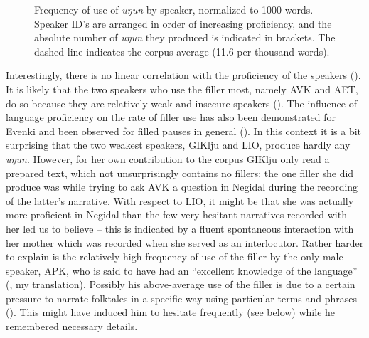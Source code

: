 \documentclass[output=paper]{langscibook}
\begin{document}
\begin{figure}
\caption{Frequency of use of \textit{uŋun} by speaker, normalized to 1000 words. Speaker ID’s are arranged in order of increasing proficiency, and the absolute number of \textit{uŋun} they produced is indicated in brackets. The dashed line indicates the corpus average (11.6 per thousand words).}
\label{fig:pakendorf:16}
\end{figure}

Interestingly, there is no linear correlation with the proficiency of the speakers (). It is likely that the two speakers who use the filler most, namely AVK and AET, do so because they are relatively weak and insecure speakers (\citealt{PakendorfAralova2018}). The influence of language proficiency on the rate of filler use has also been demonstrated for Evenki \citep[213--214]{Klyachko2022} and been observed for filled pauses in general (\citealt[220]{KosmalaCrible2022}). In this context it is a bit surprising that the two weakest speakers, GIKlju and LIO, produce hardly any \textit{uŋun}. However, for her own contribution to the corpus GIKlju only read a prepared text, which not unsurprisingly contains no fillers; the one filler she did produce was while trying to ask AVK a question in Negidal during the recording of the latter’s narrative. With respect to LIO, it might be that she was actually more proficient in Negidal than the few very hesitant narratives recorded with her led us to believe – this is indicated by a fluent spontaneous interaction with her mother which was recorded when she served as an interlocutor. Rather harder to explain is the relatively high frequency of use of the filler by the only male speaker, APK, who is said to have had an “excellent knowledge of the language” (\citealt[227]{KhasanovaKhasanova2003}, my translation). Possibly his above-average use of the filler is due to a certain pressure to narrate folktales in a specific way using particular terms and phrases (\citealt[233--234]{KhasanovaKhasanova2003}). This might have induced him to hesitate frequently (see  below) while he remembered necessary details.
\end{document}
